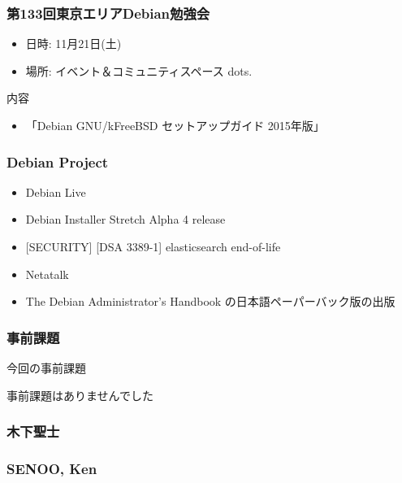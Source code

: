 \documentclass[cjk,dvipdfmx,10pt,compress,%
hyperref={bookmarks=true,bookmarksnumbered=true,bookmarksopen=false,%
colorlinks=false,%
pdftitle={第 104 回 関西 Debian 勉強会},%
pdfauthor={倉敷・のがた・佐々木・かわだ},%
pdfsubject={資料},%
}]{beamer}
\begin{document}
\begin{frame}[fragile]
  \frametitle{第133回東京エリアDebian勉強会}
  \begin{itemize}
  \item 日時: 11月21日(土)
  \item 場所: イベント＆コミュニティスペース dots.
  \end{itemize}
  \begin{block}{内容}
    \begin{itemize}
    \item 「Debian GNU/kFreeBSD セットアップガイド 2015年版」
    \end{itemize}
  \end{block}
\end{frame}

\begin{frame}[fragile]
  \frametitle{Debian Project}
  \begin{itemize}
  \item Debian Live
  \item Debian Installer Stretch Alpha 4 release
  \item \textrm{[}SECURITY] [DSA 3389-1] elasticsearch end-of-life
  \item Netatalk
  \item The Debian Administrator's Handbook の日本語ペーパーバック版の出版
  \end{itemize}
\end{frame}



\begin{frame}[fragile]
  \frametitle{事前課題}
  \begin{block}{今回の事前課題}
    \begin{description}
    \item 事前課題はありませんでした
    \end{description}
  \end{block}
\end{frame}


\begin{frame}
  \frametitle{ 木下聖士 }
\end{frame}

\begin{frame}
  \frametitle{ SENOO, Ken }
\end{frame}
\end{document}
